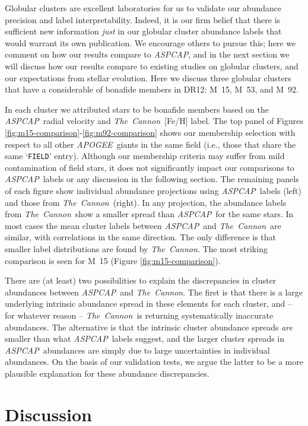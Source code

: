 \documentclass[12pt,preprint]{aastex}
\newcommand{\project}[1]{\textsl{#1}}
\newcommand{\TheCannon}{\project{The~Cannon}}
\newcommand{\acronym}[1]{{\small{#1}}}
\newcommand{\apogee}{\project{\acronym{APOGEE}}}
\newcommand{\aspcap}{\project{\acronym{ASPCAP}}}
\newcommand{\dr}{\acronym{DR12}}
\begin{document}
Globular clusters are excellent laboratories for us to validate
our abundance precision and label interpretability.  Indeed, it is our
firm belief that there is sufficient new information \emph{just} in our
globular cluster abundance labels that would warrant its own publication.
We encourage others to pursue this; here we comment on how our results 
compare to \aspcap, and in the next section we will discuss how our
results compare to existing studies on globular clusters, and our
expectations from stellar evolution.  Here we discuss three globular
clusters that have a considerable of bonafide members in \dr:
M~15, M~53, and M~92.  


In each cluster we attributed stars to be bonafide members based on the
\aspcap\ radial velocity and \TheCannon\ [Fe/H] label.  The top panel of
Figures \ref{fig:m15-comparison}-\ref{fig:m92-comparison} shows our 
membership selection with respect to all other \apogee\ giants in the
same field (i.e., those that share the same `\texttt{FIELD}' entry).
Although our membership criteria may suffer from mild contamination of
field stars, it does not significantly impact our comparisons to 
\aspcap\ labels or any discussion in the following section.  The 
remaining panels of each figure show individual abundance projections
using \aspcap\ labels (left) and those from \TheCannon\ (right). 
In any projection, the abundance labels from \TheCannon\ show a smaller
spread than \aspcap\ for the same stars.  In most cases the mean cluster
labels between \aspcap\ and \TheCannon\ are similar, with correlations
in the same direction. The only difference is that smaller label
distributions are found by \TheCannon.  The most striking comparison 
is seen for M~15 (Figure \ref{fig:m15-comparison}).


There are (at least) two possibilities to explain the discrepancies in
cluster abundances between \aspcap\ and \TheCannon.  The first is that
there is a large underlying intrinsic abundance spread in these elements
for each cluster, and -- for whatever reason -- \TheCannon\ is returning
systematically inaccurate abundances.  The alternative is that the
intrinsic cluster abundance spreads \emph{are} smaller than what \aspcap\
labels suggest, and the larger cluster spreads in \aspcap\ abundances are
simply due to large uncertainties in individual abundances.  On the basis
of our validation tests, we argue the latter to be a more plausible
explanation for these abundance discrepancies.


\section{Discussion}
\label{sec:discussion}
\end{document}
